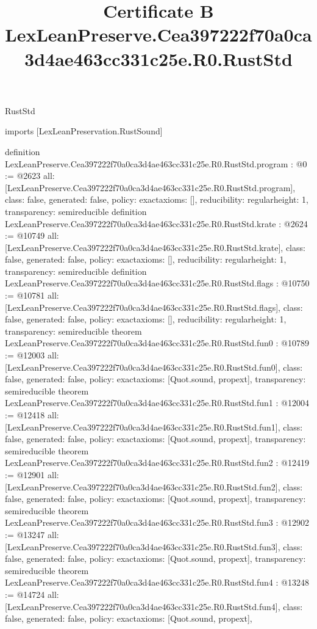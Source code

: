 \begin{lexlean}{RustStd}
\title{Certificate B LexLeanPreserve.Cea397222f70a0ca3d4ae463cc331c25e.R0.RustStd}
\begin{coremodule}
imports [LexLeanPreservation.RustSound]

definition LexLeanPreserve.Cea397222f70a0ca3d4ae463cc331c25e.R0.RustStd.program : @0 := @2623 {
  all: [LexLeanPreserve.Cea397222f70a0ca3d4ae463cc331c25e.R0.RustStd.program],
  class: false,
  generated: false,
  policy: exact{axioms: []},
  reducibility: regular{height: 1},
  transparency: semireducible
}
definition LexLeanPreserve.Cea397222f70a0ca3d4ae463cc331c25e.R0.RustStd.krate : @2624 := @10749 {
  all: [LexLeanPreserve.Cea397222f70a0ca3d4ae463cc331c25e.R0.RustStd.krate],
  class: false,
  generated: false,
  policy: exact{axioms: []},
  reducibility: regular{height: 1},
  transparency: semireducible
}
definition LexLeanPreserve.Cea397222f70a0ca3d4ae463cc331c25e.R0.RustStd.flags : @10750 := @10781 {
  all: [LexLeanPreserve.Cea397222f70a0ca3d4ae463cc331c25e.R0.RustStd.flags],
  class: false,
  generated: false,
  policy: exact{axioms: []},
  reducibility: regular{height: 1},
  transparency: semireducible
}
theorem LexLeanPreserve.Cea397222f70a0ca3d4ae463cc331c25e.R0.RustStd.fun0 : @10789 := @12003 {
  all: [LexLeanPreserve.Cea397222f70a0ca3d4ae463cc331c25e.R0.RustStd.fun0],
  class: false,
  generated: false,
  policy: exact{axioms: [Quot.sound, propext]},
  transparency: semireducible
}
theorem LexLeanPreserve.Cea397222f70a0ca3d4ae463cc331c25e.R0.RustStd.fun1 : @12004 := @12418 {
  all: [LexLeanPreserve.Cea397222f70a0ca3d4ae463cc331c25e.R0.RustStd.fun1],
  class: false,
  generated: false,
  policy: exact{axioms: [Quot.sound, propext]},
  transparency: semireducible
}
theorem LexLeanPreserve.Cea397222f70a0ca3d4ae463cc331c25e.R0.RustStd.fun2 : @12419 := @12901 {
  all: [LexLeanPreserve.Cea397222f70a0ca3d4ae463cc331c25e.R0.RustStd.fun2],
  class: false,
  generated: false,
  policy: exact{axioms: [Quot.sound, propext]},
  transparency: semireducible
}
theorem LexLeanPreserve.Cea397222f70a0ca3d4ae463cc331c25e.R0.RustStd.fun3 : @12902 := @13247 {
  all: [LexLeanPreserve.Cea397222f70a0ca3d4ae463cc331c25e.R0.RustStd.fun3],
  class: false,
  generated: false,
  policy: exact{axioms: [Quot.sound, propext]},
  transparency: semireducible
}
theorem LexLeanPreserve.Cea397222f70a0ca3d4ae463cc331c25e.R0.RustStd.fun4 : @13248 := @14724 {
  all: [LexLeanPreserve.Cea397222f70a0ca3d4ae463cc331c25e.R0.RustStd.fun4],
  class: false,
  generated: false,
  policy: exact{axioms: [Quot.sound, propext]},
}
\end{coremodule}
\end{lexlean}
